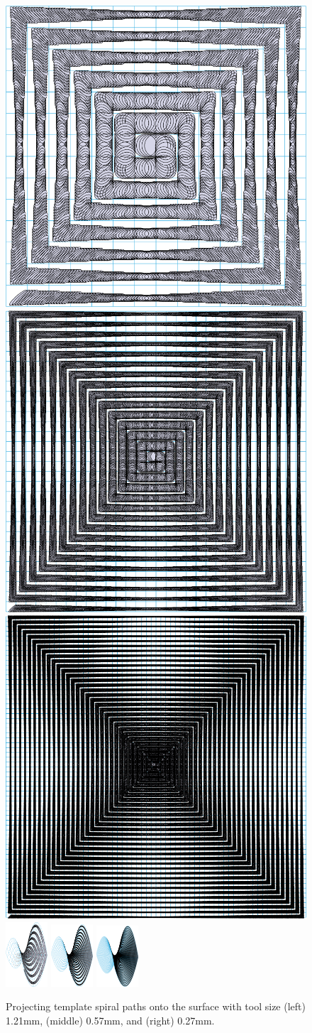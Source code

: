 \documentclass[lettersize,journal]{IEEEtran}
\begin{document}
\begin{figure}[t]
\centering
\includegraphics[height=0.14\textwidth]{figures/new_saddle/spiral/sparse_top}
\includegraphics[height=0.14\textwidth]{figures/new_saddle/spiral/middle_top}
\includegraphics[height=0.14\textwidth]{figures/new_saddle/spiral/dense_top}
\includegraphics[width=0.14\textwidth]{figures/new_saddle/spiral/sparse}
\includegraphics[width=0.14\textwidth]{figures/new_saddle/spiral/middle}
\includegraphics[width=0.14\textwidth]{figures/new_saddle/spiral/dense}
\caption{
Projecting template spiral paths onto the surface with tool size (left) 1.21mm, (middle) 0.57mm, and (right) 0.27mm. 
}\label{fig:exp_spiral}
\end{figure}
\end{document}
